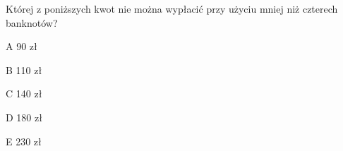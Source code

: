 \begin{tresc}
Której z poniższych kwot nie można wypłacić przy użyciu mniej niż czterech banknotów?
\end{tresc}
\begin{wariant}{A} 90 zł \end{wariant}
\begin{wariant}{B} 110 zł \end{wariant}
\begin{wariant}{C} 140 zł \end{wariant}
\begin{wariant}{D} 180 zł \end{wariant}
\begin{wariant}{E} 230 zł \end{wariant}
